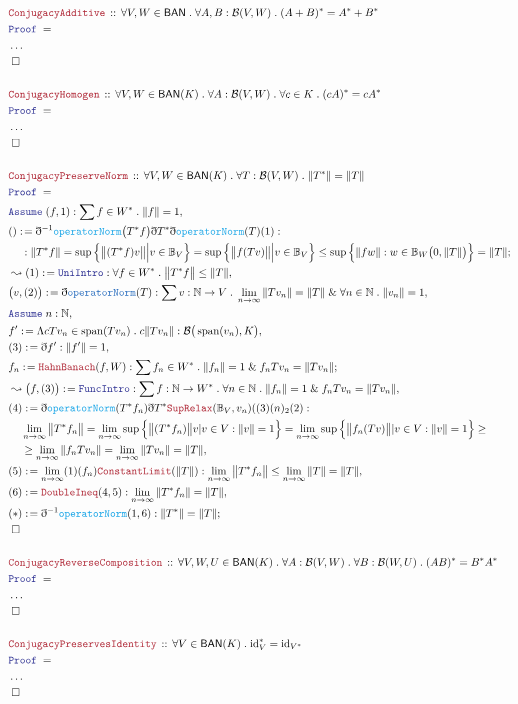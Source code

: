 \documentclass[12pt]{scrartcl}
\newcommand{\TYPE}[1]{\textcolor{NavyBlue}{\mathtt{#1}}}
\newcommand{\FUNC}[1]{\textcolor{Cerulean}{\mathtt{#1}}}
\newcommand{\LOGIC}[1]{\textcolor{Blue}{\mathtt{#1}}}
\newcommand{\THM}[1]{\textcolor{Maroon}{\mathtt{#1}}}
\renewcommand{\.}{\; . \;}
\newcommand{\de}{: \kern 0.1pc =}
\newcommand{\Theorem}[2]{& \THM{#1} \, :: \, #2 \\ & \Proof = \\ }
\newcommand{\NewLine}{\\ & \kern 1pc}
\newcommand{\Page}[1]{\begin{align*} #1 \end{align*} \newpage   }
\newcommand{ \bd }{ \ByDef }
\newcommand{\NoProof}{ & \ldots \\ \EndProof}
\renewcommand{\And}{\; \& \;}
\newcommand{\Nat}{\mathbb{N} }
\newcommand{\Say}[3]{& #1 \de #2 : #3, \\}
\newcommand{\Conclude}[3]{& #1 \de #2 : #3; \\}
\newcommand{\Derive}[3]{& \leadsto #1 \de #2 : #3, \\}
\newcommand{\A}{\LOGIC{Assume} \;}
\newcommand{\Assume}[2]{& \A #1 : #2, \\}
\newcommand{\QED}{\; \square}
\newcommand{\EndProof}{& \QED \\}
\newcommand{\ByDef}{\eth}
\newcommand{\Proof}{\LOGIC{Proof} \; }
\DeclareMathOperator{\Span}{span}
\newcommand{\BAN}{\textsf{BAN}}
\newcommand{\B}{\mathcal{B}}
\begin{document}
\Page{
\Theorem{ConjugacyAdditive}{\forall V,W \in \BAN \. \forall A,B : \B(V,W) \.  (A + B)^* = A^* + B^*}
\NoProof
\\
\Theorem{ConjugacyHomogen}
{\forall V,W \in \BAN(K) \. \forall A : \B(V,W) \. \forall c \in K \. (cA)^* = c A^*}
\NoProof
\\
\Theorem{ConjugacyPreserveNorm}{
\forall V,W \in \BAN(K) \. \forall T : \B(V,W) \. \| T^* \| = \| T \|}
\Assume{(f,1)}{ \sum f \in W^* \. \| f \| = 1 }
\Conclude{()}{\bd^{-1} \FUNC{operatorNorm}\big(T^*f\big)\bd T^* \bd \FUNC{operatorNorm}(T)(1)}{
 \NewLine :
\| T^* f \| = \sup \Big\{  \big\| ( T^* f ) v \big\|  \Big| v \in \mathbb{B}_V \Big\} 
 = \sup \Big\{  \big\| f (Tv) \big\| \Big|   v \in \mathbb{B}_V  \Big\} \le \sup \Big\{  \| f w \|  :  w \in \mathbb{B}_W\big(0,\|T\|\big)   
 \Big\} = \| T \|
}
\Derive{(1)}{\LOGIC{UniIntro}}{\forall f \in W^* \. \big\| T^* f \big\| \le \| T \|}
\Say{\big(v, (2) \big)}{ \bd \TYPE{operatorNorm}(T) }{ \sum v : \Nat \to V  \. \lim_{n \to \infty} \| T v_n \| = \| T \| \And \forall n \in \Nat \. \| v_n \| = 1}
\Assume{n}{\Nat}
\Say{f'}{\Lambda cTv_n \in \Span(Tv_n) \. c\| T v_n \|}{\B \big(\Span(v_n),K \big)}
\Say{(3)}{\bd f'}{\| f' \| = 1}
\Conclude{f_n}{\THM{HahnBanach}(f,W)}{ \sum f_n \in W^* \.  \| f_n \| = 1 \And f_n Tv_n = \| Tv_n \|}
\Derive{\big(f,(3)\big)}{\LOGIC{FuncIntro}}{\sum f : \Nat \to W^* \. \forall n \in \Nat \. \| f_n \| = 1 \And f_n T v_n = \| T v_n \|}
\Say{(4)}{\bd \FUNC{operatorNorm}(T^* f_n)\bd T^* \THM{SupRelax}(\mathbb{B}_V,v_n)((3)(n)_2(2) }{
 \NewLine
 \lim_{n \to \infty} \big\| T^* f_n \big\|
= \lim_{n \to \infty} \sup \Big\{  \big\| (T^* f_n ) \big\| v | v \in V : \| v \| = 1    \Big\} =
\lim_{n \to \infty} \sup \Big\{ \big\| f_n(T v) \big\| | v \in V : \| v \| = 1  \Big\} 
\ge \NewLine
\ge \lim_{n \to \infty} \| f_n T v_n \| = \lim_{n \to \infty} \| T v_n \| =  \| T \|
}
\Say{(5)}{\lim_{n \to \infty} (1)(f_n)\THM{ConstantLimit}(\| T \|)}{\lim_{n \to \infty} \big\| T^* f_n \big\| \le \lim_{n \to \infty} \|  T \| = \|T\|}
\Say{(6)}{\THM{DoubleIneq}(4,5)}{\lim_{n \to \infty} \| T^* f_n \|  =  \| T \|}
\Conclude{(*)}{\bd^{-1} \FUNC{operatorNorm}(1,6)}{\| T^* \| = \| T \|}
\EndProof
\\
\Theorem{ConjugacyReverseComposition}{\forall V,W,U \in \BAN(K) \. \forall A : \B(V,W) \. \forall
B : \B(W,U) \. (AB)^* = B^*A^*}
\NoProof
\\
\Theorem{ConjugacyPreservesIdentity}{\forall V \in  \BAN(K) \. \mathrm{id}_V^* = \mathrm{id}_{V^*}}
\NoProof
}
\end{document}
